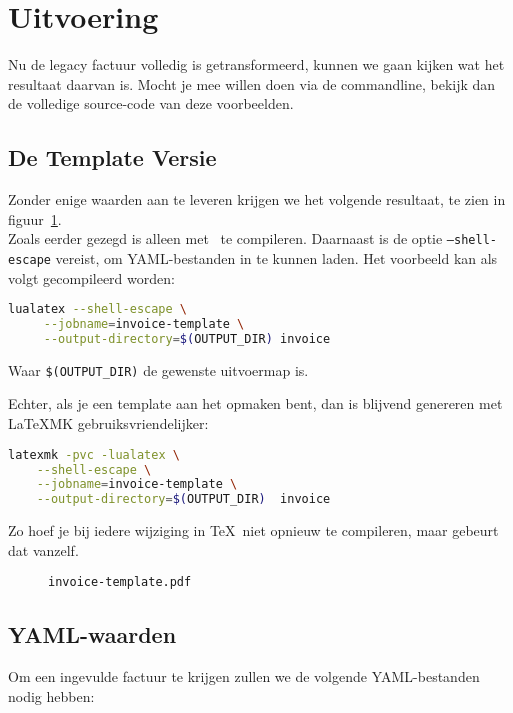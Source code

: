 \section{Uitvoering}\label{sec:output}
Nu de legacy factuur volledig is getransformeerd, kunnen we gaan kijken wat het resultaat daarvan is.
Mocht je mee willen doen via de commandline, bekijk dan de volledige source-code\cite{ginvoice-template} van deze voorbeelden.

\subsection{De Template Versie}
Zonder enige waarden aan te leveren krijgen we het volgende resultaat, te zien in figuur~\ref{fig:template}.\\

Zoals eerder gezegd is  alleen met \LuaLaTeX\ te compileren.
Daarnaast is de optie \texttt{--shell-escape} vereist, om YAML-bestanden in te kunnen laden.
Het voorbeeld kan als volgt gecompileerd worden:
\begin{lstlisting}[language=bash,caption={Compileren met \texttt{lualatex}}]
lualatex --shell-escape \
     --jobname=invoice-template \
     --output-directory=$(OUTPUT_DIR) invoice
\end{lstlisting}
Waar \texttt{\$(OUTPUT\_DIR)} de gewenste uitvoermap is.

Echter, als je een template aan het opmaken bent, dan is blijvend genereren met \LaTeX MK gebruiksvriendelijker:
\begin{lstlisting}[language=bash,caption={Compileren met \texttt{latexmk}}]
latexmk -pvc -lualatex \
    --shell-escape \
    --jobname=invoice-template \
    --output-directory=$(OUTPUT_DIR)  invoice
\end{lstlisting}
Zo hoef je bij iedere wijziging in \TeX\ niet opnieuw te compileren, maar gebeurt dat vanzelf.

\begin{figure}[t]%
    \caption{\texttt{invoice-template.pdf}}\label{fig:template}%
\end{figure}


\subsection{YAML-waarden}
Om een ingevulde factuur te krijgen zullen we de volgende YAML-bestanden nodig hebben:

